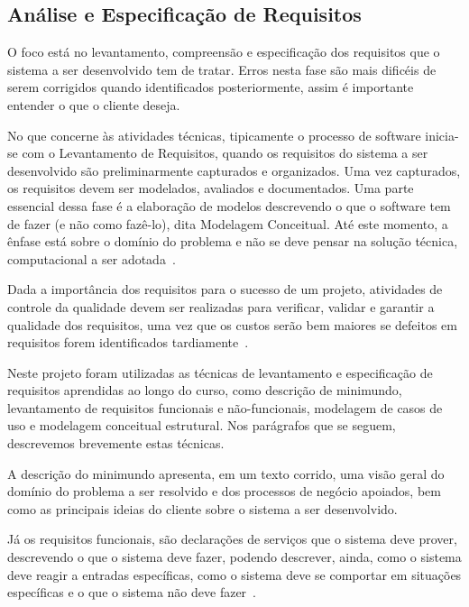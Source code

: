 \subsection{Análise e Especificação de Requisitos}
\label{sec-referencial-engenharia-software-atividade-desenvolvimento-analise-especificacao-requisisto}

O foco está no levantamento, compreensão e especificação dos requisitos que o sistema a ser desenvolvido tem de tratar.  Erros nesta fase são mais dificéis de serem corrigidos quando identificados posteriormente, assim é importante entender o que o cliente deseja.%

No que concerne às atividades técnicas, tipicamente o processo de software inicia-se com o Levantamento de Requisitos, quando os requisitos do sistema a ser desenvolvido são preliminarmente capturados e organizados. Uma vez capturados, os requisitos devem ser modelados, avaliados e documentados. Uma parte essencial dessa fase é a elaboração de modelos descrevendo o que o software tem de fazer (e não como fazê-lo), dita Modelagem Conceitual. Até este momento, a ênfase está sobre o domínio do problema e não se deve pensar na solução técnica, computacional a ser adotada~\cite{falboEngReq}.

Dada a importância dos requisitos para o sucesso de um projeto, atividades de controle da qualidade devem ser realizadas para verificar, validar e garantir a qualidade dos requisitos, uma vez que os custos serão bem maiores se defeitos em requisitos forem identificados tardiamente~\cite{falboEngReq}.

Neste projeto foram utilizadas as técnicas de levantamento e especificação de requisitos aprendidas ao longo do curso, como descrição de minimundo, levantamento de requisitos funcionais e não-funcionais, modelagem de casos de uso e modelagem conceitual estrutural. Nos parágrafos que se seguem, descrevemos brevemente estas técnicas.

A descrição do minimundo apresenta, em um texto corrido, uma visão geral do domínio do problema a ser resolvido e dos processos de negócio apoiados, bem como as principais ideias do cliente sobre o sistema a ser desenvolvido.

Já os requisitos funcionais, são declarações de serviços que o sistema deve prover, descrevendo o que o sistema deve fazer, podendo descrever, ainda, como o sistema deve reagir a entradas específicas, como o sistema deve se comportar em situações específicas e o que o sistema não deve fazer~\cite{sommerville}.

